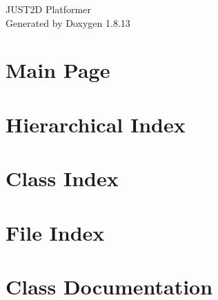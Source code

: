 \documentclass[twoside]{book}
\newcommand{\+}{\discretionary{\mbox{\scriptsize$\hookleftarrow$}}{}{}}
\newcommand{\clearemptydoublepage}{%
  \newpage{\pagestyle{empty}\cleardoublepage}%
}
\begin{document}
\hypersetup{pageanchor=false,
             bookmarksnumbered=true,
             pdfencoding=unicode
            }
\begin{titlepage}
\vspace*{7cm}
\begin{center}%
{\Large J\+U\+S\+T2D Platformer }\\
\vspace*{1cm}
{\large Generated by Doxygen 1.8.13}\\
\end{center}
\end{titlepage}
\clearemptydoublepage
{}
\tableofcontents
\clearemptydoublepage
{}
\hypersetup{pageanchor=true}

\chapter{Main Page}
\label{index}\hypertarget{index}{}
\chapter{Hierarchical Index}

\chapter{Class Index}

\chapter{File Index}

\chapter{Class Documentation}







































\end{document}
